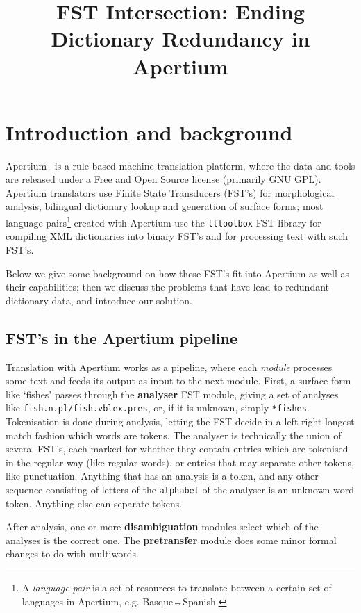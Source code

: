 \documentclass[10pt, a4paper]{article}
\title{FST Intersection: Ending Dictionary Redundancy in Apertium} %
\newcommand{\ana}[1]{\texttt{#1}}
\newcommand{\f}[1]{`#1'}
\newcommand{\tool}[1]{\texttt{#1}}
\begin{document}
\maketitleabstract

\section{Introduction and background}

Apertium~\cite{forcada2011afp} is a rule-based machine translation
platform, where the data and tools are released under a Free and Open
Source license (primarily GNU GPL). Apertium translators use Finite
State Transducers (FST's) for morphological analysis, bilingual
dictionary lookup and generation of surface forms; most language
pairs\footnote{A \emph{language pair} is a set of resources to
  translate between a certain set of languages in Apertium, e.g.
  Basque↔Spanish.} created with Apertium use the \tool{lttoolbox}
FST library for compiling XML dictionaries into binary FST's and for
processing text with such FST's.

Below we give some background on how these FST's fit into Apertium as
well as their capabilities; then we discuss the problems that have
lead to redundant dictionary data, and introduce our solution.

\subsection{FST's in the Apertium pipeline}
\label{sec:pipeline}

Translation with Apertium works as a pipeline, where each
\emph{module} processes some text and feeds its output as input to the
next module. First, a surface form like \f{fishes} passes through the
\textbf{analyser} FST module, giving a set of analyses like
\ana{fish.n.pl/fish.vblex.pres}, or, if it is unknown, simply
\ana{*fishes}. Tokenisation is done during analysis, letting the FST
decide in a left-right longest match fashion which words are tokens.
The analyser is technically the union of several FST's, each marked
for whether they contain entries which are tokenised in the regular
way (like regular words), or entries that may separate other tokens,
like punctuation. Anything that has an analysis is a token, and any
other sequence consisting of letters of the \texttt{alphabet} of the
analyser is an unknown word token. Anything else can separate tokens.

After analysis, one or more \textbf{disambiguation} modules select
which of the analyses is the correct one. The \textbf{pretransfer}
module does some minor formal changes to do with multiwords.
\end{document}
